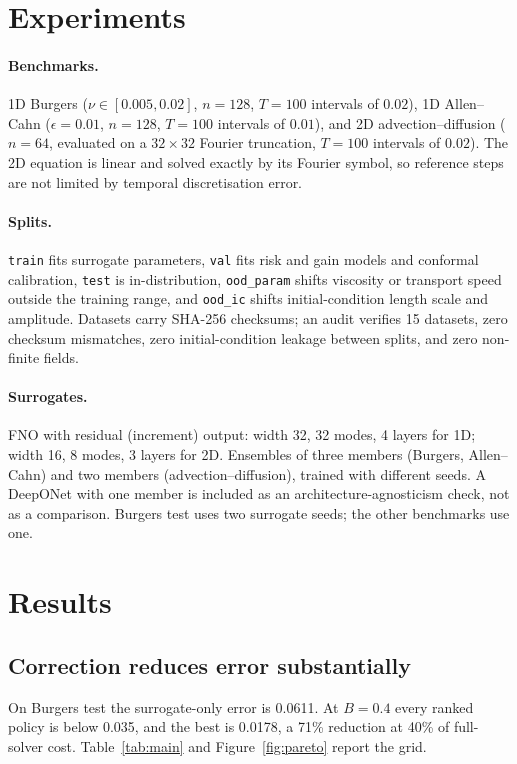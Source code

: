 \documentclass[11pt]{article}
\begin{document}
\section{Experiments}

\paragraph{Benchmarks.} 1D Burgers ($\nu\in[0.005,0.02]$, $n=128$, $T=100$
intervals of $0.02$), 1D Allen--Cahn ($\epsilon=0.01$, $n=128$, $T=100$
intervals of $0.01$), and 2D advection--diffusion ($n=64$, evaluated on a
$32\times32$ Fourier truncation, $T=100$ intervals of $0.02$). The 2D equation
is linear and solved exactly by its Fourier symbol, so reference steps are not
limited by temporal discretisation error.

\paragraph{Splits.} \texttt{train} fits surrogate parameters, \texttt{val} fits
risk and gain models and conformal calibration, \texttt{test} is in-distribution,
\texttt{ood\_param} shifts viscosity or transport speed outside the training
range, and \texttt{ood\_ic} shifts initial-condition length scale and amplitude.
Datasets carry SHA-256 checksums; an audit verifies 15 datasets, zero checksum
mismatches, zero initial-condition leakage between splits, and zero non-finite
fields.

\paragraph{Surrogates.} FNO with residual (increment) output: width 32, 32 modes,
4 layers for 1D; width 16, 8 modes, 3 layers for 2D. Ensembles of three members
(Burgers, Allen--Cahn) and two members (advection--diffusion), trained with
different seeds. A DeepONet with one member is included as an
architecture-agnosticism check, not as a comparison. Burgers test uses two
surrogate seeds; the other benchmarks use one.

\section{Results}
\label{sec:results}

\subsection{Correction reduces error substantially}
On Burgers test the surrogate-only error is 0.0611. At $B=0.4$ every ranked
policy is below 0.035, and the best is 0.0178, a 71\% reduction at 40\% of
full-solver cost. Table~\ref{tab:main} and Figure~\ref{fig:pareto} report the grid.
\end{document}
